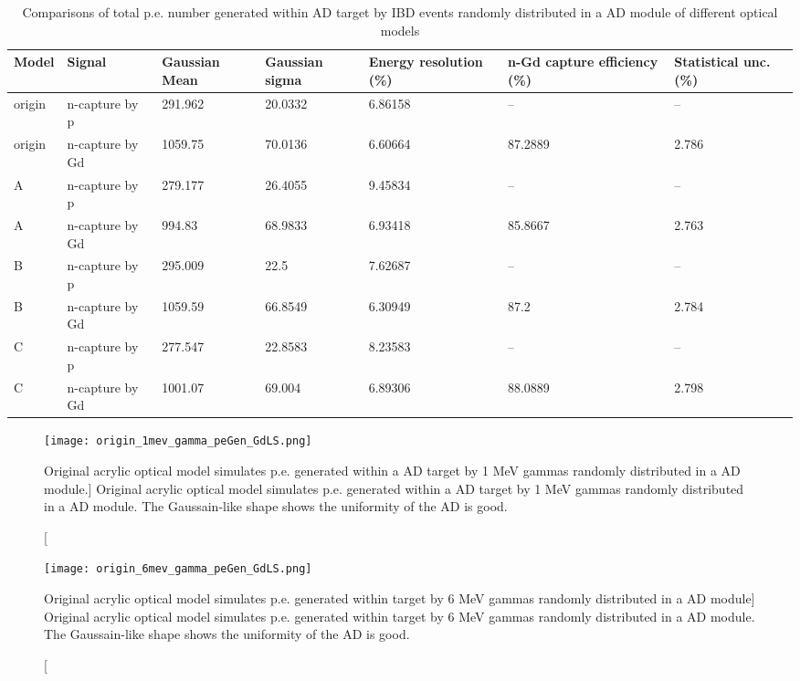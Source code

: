 \begin{table}
\centering
\caption{Comparisons of total p.e. number generated within AD target by IBD events randomly distributed
in a AD module of different optical models}
\label{tab:peGenGdLSOpModelIBD}
\begin{tabular}{llp{1.5cm}p{1.5cm}p{2.0cm}p{2.7cm}p{2.5cm}}
Model & Signal &  Gaussian Mean  &  Gaussian sigma & Energy resolution (\%) & n-Gd capture efficiency (\%) & Statistical unc. (\%) \\
\hline
\hline
origin  & n-capture by p    & 291.962 & 20.0332 & 6.86158 & -- & -- \\
origin  & n-capture by Gd   & 1059.75 & 70.0136 & 6.60664 & 87.2889 & 2.786\\
A       & n-capture by p    & 279.177 & 26.4055 & 9.45834 & -- & -- \\
A       & n-capture by Gd   & 994.83  & 68.9833 & 6.93418 & 85.8667 & 2.763 \\
B       & n-capture by p    & 295.009 & 22.5 & 7.62687 & -- & -- \\
B       & n-capture by Gd   & 1059.59 & 66.8549 & 6.30949 & 87.2 & 2.784 \\
C       & n-capture by p    & 277.547 & 22.8583 & 8.23583 & -- & -- \\
C       & n-capture by Gd   & 1001.07 & 69.004 & 6.89306 &  88.0889 & 2.798 \\
\hline
\end{tabular}
\end{table}


\begin{figure}
    \centering
    \texttt{[image: origin\_1mev\_gamma\_peGen\_GdLS.png]}
    \caption
[Original acrylic optical model simulates p.e. generated within a AD target by 1 MeV gammas randomly distributed in a AD module.]
{Original acrylic optical model simulates p.e. generated within a AD target by 1 MeV gammas randomly distributed in a AD module. The Gaussain-like shape shows the uniformity of the AD is good.}
    \label{fig:origin_1mev_gamma_peGen_GdLS}
    \end{figure}


\begin{figure}
    \centering
    \texttt{[image: origin\_6mev\_gamma\_peGen\_GdLS.png]}
    \caption
    [Original acrylic optical model simulates p.e. generated within target by 6 MeV gammas randomly distributed in a AD module]
    {Original acrylic optical model simulates p.e. generated within target by 6 MeV gammas randomly distributed in a AD module. The Gaussain-like shape shows the uniformity of the AD is good.}
    \label{fig:origin_6mev_gamma_peGen_GdLS}
    \end{figure}


